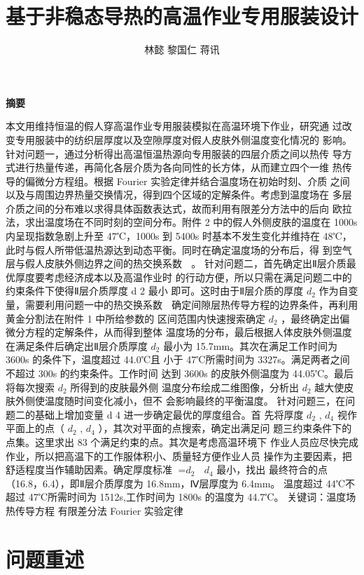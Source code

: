 \documentclass{article}
\begin{document}
	
	
	\title{\bf 基于非稳态导热的高温作业专用服装设计}
	\author{林懿 黎国仁 蒋讯}
	\maketitle
	\begin{center}
		{\bf 摘要}
	\end{center}
	本文用维持恒温的假人穿高温作业专用服装模拟在高温环境下作业，研究通
	过改变专用服装中的纺织层厚度以及空隙厚度对假人皮肤外侧温度变化情况的
	影响。
	针对问题一，通过分析得出高温恒温热源向专用服装的四层介质之间以热传
	导方式进行热量传递，再简化各层介质为各向同性的长方体，从而建立四个一维
	热传导的偏微分方程组。根据 Fourier 实验定律并结合温度场在初始时刻、介质
	之间以及与周围边界热量交换情况，得到四个区域的定解条件。考虑到温度场在
	多层介质之间的分布难以求得具体函数表达式，故而利用有限差分方法中的后向
	欧拉法，求出温度场在不同时刻的空间分布。附件 2 中的假人外侧皮肤的温度在
	1000s 内呈现指数急剧上升至 47℃，1000s 到 5400s 时基本不发生变化并维持在
	48℃，此时与假人所带低温热源达到动态平衡。同时在确定温度场的分布后，得
	到空气层与假人皮肤外侧边界之间的热交换系数  。
	针对问题二，首先确定出Ⅱ层介质最优厚度要考虑经济成本以及高温作业时
	的行动方便，所以只需在满足问题二中的约束条件下使得Ⅱ层介质厚度 d 2 最小
	即可。这时由于Ⅱ层介质的厚度 $d_{2}$ 作为自变量，需要利用问题一中的热交换系数
	 确定间隙层热传导方程的边界条件，再利用黄金分割法在附件 1 中所给参数的
	区间范围内快速搜索确定 $d_{2}$ ，最终确定出偏微分方程的定解条件，从而得到整体
	温度场的分布，最后根据人体皮肤外侧温度在满足条件后确定出Ⅱ层介质厚度
	$d_{2}$ 最小为 15.7mm。其次在满足工作时间为 3600s 的条件下，温度超过 44.0℃且
	小于 47℃所需时间为 3327s。满足两者之间不超过 300s 的约束条件。工作时间
	达到 3600s 的皮肤外侧温度为 44.05℃。最后将每次搜索 $d_{2}$ 所得到的皮肤最外侧
	温度分布绘成二维图像，分析出 $d_{2}$ 越大使皮肤外侧使温度随时间变化减小，但不
	会影响最终的平衡温度。
	针对问题三，在问题二的基础上增加变量 d 4 进一步确定最优的厚度组合。首
	先将厚度 $d_{2}$ , $d_{4}$ 视作平面上的点（ $d_{2}$ , $d_{4}$ ），其次对平面的点搜索，确定出满足问
	题三约束条件下的点集。这里求出 83 个满足约束的点。其次是考虑高温环境下
	作业人员应尽快完成作业，所以把高温下的工作服体积小、质量轻方便作业人员
	操作为主要因素，把舒适程度当作辅助因素。确定厚度标准 =$d_{2}$  $d_{4}$ 最小，找出
	最终符合的点（16.8，6.4），即Ⅱ层介质厚度为 16.8mm，Ⅳ层厚度为 6.4mm。
	温度超过 44℃不超过 47℃所需时间为 1512s,工作时间为 1800s 的温度为 44.7℃。
	关键词：温度场 热传导方程 有限差分法 Fourier 实验定律
	\section{问题重述}
	
\end{document}
